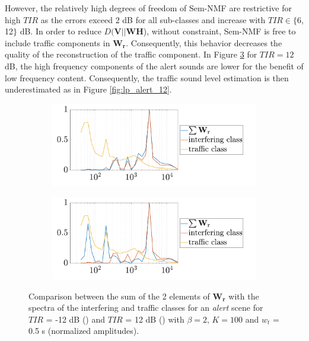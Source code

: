 \documentclass[twocolumn,a4paper,10pt]{article}
\begin{document}
However, the relatively high degrees of freedom of Sem-NMF are restrictive for high $TIR$ as the errors exceed 2 dB for all sub-classes and increase with $TIR \in \lbrace$6, 12$\rbrace$ dB. In order to reduce $D(\mathbf{V} \vert \vert \mathbf{WH}$), without constraint, Sem-NMF is free to include traffic components in $\mathbf{W_r}$. Consequently, this behavior decreases the quality of the reconstruction of the traffic component. In Figure \ref{fig:Y_alert_12} for $TIR=12$ dB, the high frequency components of the alert sounds are lower for the benefit of low frequency content. Consequently, the traffic sound level estimation is then underestimated as in Figure \ref{fig:lp_alert_12}. \\

\begin{figure}
    \centering
    \begin{subfigure}[t]{0.45\textwidth}
        \centering
        \includegraphics[width=\linewidth]{figures/Y_alert_-12.pdf}
        \caption{}
        \label{fig:Y_alert-12}
    \end{subfigure}
    \vfill
    \begin{subfigure}[t]{0.45\textwidth}
        \centering
        \includegraphics[width=\linewidth]{figures/Y_alert_12.pdf}
        \caption{}
		\label{fig:Y_alert_12}
    \end{subfigure}
    \caption{Comparison between the sum of the 2 elements of $\mathbf{W_r}$ with the spectra of the interfering and traffic classes for an \textit{alert} scene for $TIR$ = -12 dB  () and $TIR$ = 12 dB () with $\beta = 2$, $K = 100$ and $w_t$ = 0.5 s (normalized amplitudes).}
\end{figure}
\end{document}
